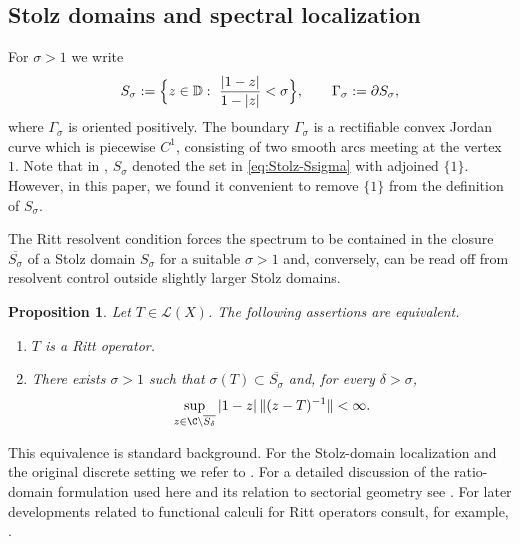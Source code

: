 \documentclass[11pt]{amsart}
\numberwithin{equation}{section}
\newtheorem{proposition}[theorem]{Proposition}
\theoremstyle{definition}
\theoremstyle{plain}
\def\L{L}
\def\D{\mathbb{D}}
\renewcommand{\L}{\mathcal L}
\begin{document}
\subsection{Stolz domains and spectral localization}

For $\sigma>1$ we write
\begin{equation}\label{eq:Stolz-Ssigma}
  S_\sigma:=\Bigl\{z\in\D:\ \frac{|1-z|}{1-|z|}<\sigma\Bigr\},%
  \qquad \Gamma_\sigma:=\partial S_\sigma,
\end{equation}
where $\Gamma_\sigma$ is oriented positively. The boundary $\Gamma_\sigma$ is a
rectifiable convex Jordan curve which is piecewise $C^1$, consisting of two smooth arcs
meeting at the vertex $1$.
Note that in \cite{GomTom-Indiana}, $S_\sigma$  denoted the set in \eqref{eq:Stolz-Ssigma}
with adjoined $\{1\}.$ However, in this paper, we found it convenient to remove $\{1\}$
from the definition of $S_\sigma.$


The Ritt resolvent condition forces the spectrum to be contained in the closure 
\(\overline{S_\sigma}\) of a Stolz domain $S_\sigma$
 for a suitable \(\sigma>1\) and,
conversely, can be read off from resolvent control outside 
slightly larger Stolz
domains.
\begin{proposition}\label{prop:Stolz-localization-prelim}
Let $T\in\L(X)$. The following assertions are equivalent.
\begin{enumerate}
\item [(i)] $T$ is a Ritt operator.
\item [(ii)] There exists $\sigma>1$ such that $\sigma(T)\subset \overline{S_\sigma}$ and,
for every $\delta>\sigma$,
\begin{equation}\label{eq:off-Stolz-resolvent-prelim}
\sup_{z\in\C\setminus \overline{S_\delta}}
 |1-z|\,\|(z-T)^{-1}\|<\infty.
\end{equation}
\end{enumerate}
\end{proposition}

This equivalence is standard background. For the Stolz-domain localization and the original discrete setting we refer to \cite{Lyubich}. For a detailed discussion of the ratio-domain formulation used here  and its relation to sectorial geometry  see \cite{GomTom-Indiana}. For later developments related to functional calculi for Ritt operators consult, for example, \cite{LeMerdy}. 
\end{document}
